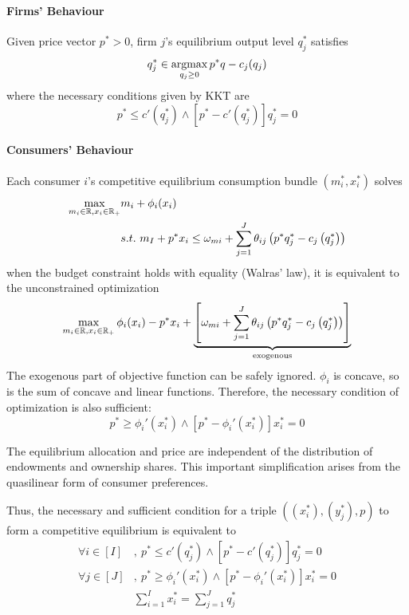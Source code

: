 \documentclass{report}
\begin{document}
	 	\paragraph{Firms' Behaviour} Given price vector $p^* > 0$, firm $j$'s equilibrium output level $q_j^*$ satisfies
	 		\begin{equation}
	 			q_j^* \in \operatorname*{argmax}_{q_j \geq 0} p^* q - c_j(q_j)
	 		\end{equation}
	 		where the necessary conditions given by KKT are
	 		\begin{equation}
	 			p^* \leq c'(q_j^*) \land [p^* - c'(q_j^*)] q_j^* = 0 
	 		\end{equation}
	 	\paragraph{Consumers' Behaviour} Each consumer $i$'s competitive equilibrium consumption bundle $(m_i^*, x_i^*)$ solves
	 		\begin{align}
	 			\max_{m_i \in \mathbb{R}, x_i \in \mathbb{R}_+}& m_i + \phi_i(x_i) \\
	 			&s.t.\ m_{I}+p^{*} x_{i} \leq \omega_{m i}+\sum_{j=1}^{J} \theta_{i j}\left(p^{*} q_{j}^{*}-c_{j}\left(q_{j}^{*}\right)\right)
	 		\end{align}
	 		when the budget constraint holds with equality (Walras' law), it is equivalent to the unconstrained optimization
	 		\begin{equation}
	 			\max_{m_i \in \mathbb{R}, x_i \in \mathbb{R}_+}
	 			\phi_i(x_i) - p^* x_i 
	 			+ \underbrace{\left [
	 			\omega_{m i}
	 			+ \sum_{j=1}^{J} \theta_{i j}\left(p^{*} q_{j}^{*}-c_{j}\left(q_{j}^{*}\right)\right)
	 			\right]}_{\text{{exogenous}}}
	 		\end{equation}
	 		The exogenous part of objective function can be safely ignored. $\phi_i$ is concave, so is the sum of concave and linear functions. Therefore, the necessary condition of optimization is also sufficient:
	 		\begin{equation}
	 			p^* \geq \phi_i'(x_i^*) \land [p^* - \phi_i'(x_i^*)] x_i^* = 0
	 		\end{equation}
	 		\begin{remark}
	 			The equilibrium allocation and price are independent of the distribution of endowments and ownership shares. This important simplification arises from the quasilinear form of consumer preferences.
	 		\end{remark}
	 		
	 		\par Thus, the necessary and sufficient condition for a triple $((x^*_i), (y^*_j), p)$ to form a competitive equilibrium is equivalent to
	 		\begin{align}
	 			\forall i \in [I]&,\ p^* \leq c'(q_j^*) \land [p^* - c'(q_j^*)] q_j^* = 0\\
	 			\forall j \in [J]&,\ p^* \geq \phi_i'(x_i^*) \land [p^* - \phi_i'(x_i^*)] x_i^* = 0\\
	 			&\sum_{i=1}^{I} x_{i}^{*}=\sum_{j=1}^{J} q_{j}^{*}
	 		\end{align}
	 	
\end{document}
